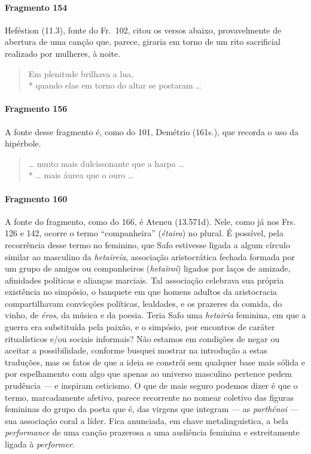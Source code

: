 \paragraph{Fragmento 154}

{\small Heféstion (11.3), fonte do Fr.~102, citou os versos abaixo, provavelmente de abertura
de uma canção que, parece, giraria em torno de um rito sacrificial realizado
por mulheres, à noite.}

\begin{verse}
Em plenitude brilhava a lua, \\*
quando elas em torno do altar se postaram \ldots{}
\end{verse}

\paragraph{Fragmento 156}

{\small A fonte desse fragmento é, como do 101, Demétrio (161s.), que recorda o uso da
hipérbole.}

\begin{verse}
\ldots{} muito mais dulcissonante que a harpa \ldots{}\\*
\ldots{} mais áurea que o ouro \ldots{}
\end{verse}

\paragraph{Fragmento 160}

{\small A fonte do fragmento, como do 166, é Ateneu (13.571d). Nele, como já nos Frs.
126 e 142, ocorre o termo ``companheira” (\textit{étaira}) no plural. É
possível, pela recorrência desse termo no feminino, que Safo estivesse ligada a
algum círculo similar ao masculino da \textit{hetaireía}, associação
aristocrática fechada formada por um grupo de amigos ou companheiros
(\textit{hetaîroi}) ligados por laços de amizade, afinidades políticas e
alianças marciais. Tal associação celebrava sua própria existência no simpósio,
o banquete em que homens adultos da aristocracia compartilhavam convicções
políticas, lealdades, e os prazeres da comida, do vinho, de \textit{éros}, da música e 
da poesia. Teria Safo uma \textit{hetairía }feminina, em que a guerra era substituída pela
paixão, e o simpósio, por encontros de caráter ritualísticos e/ou sociais
informais? Não estamos em condições de negar ou aceitar a possibilidade,
conforme busquei mostrar na introdução a estas traduções, mas os fatos de que a
ideia se constrói sem qualquer base mais sólida e por espelhamento com algo que
apenas ao universo masculino pertence pedem prudência --- e inspiram ceticismo.
O que de mais seguro podemos dizer é que o termo, marcadamente afetivo, parece recorrente no nomear coletivo das figuras femininas do grupo da poeta que é, das virgens que integram --- as \textit{parthénoi} --- sua associação coral a líder. Fica anunciada, em chave metalinguística, a bela \textit{performance}
de uma canção prazerosa a uma audiência feminina e estreitamente ligada à
\textit{performer}.}

